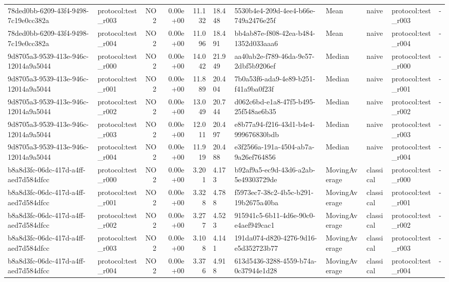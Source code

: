 \begin{table}[htbp]
\begin{tabular}{llrrr}
78ded0bb-6209-43f4-9498-7c19e0cc382a & protocol:test\_r003 & NO2 & 0.00e+00 & 11.132 & 18.448 & 5530b4e4-209d-4ee4-b66e-749a2476e25f & Mean & naive & protocol:test\_r003 & - \\
78ded0bb-6209-43f4-9498-7c19e0cc382a & protocol:test\_r004 & NO2 & 0.00e+00 & 11.096 & 18.491 & bb4ab87e-f808-42ea-b484-1352d033aaa6 & Mean & naive & protocol:test\_r004 & - \\
9d8705a3-9539-413e-946c-12014a9a5044 & protocol:test\_r000 & NO2 & 0.00e+00 & 14.042 & 21.949 & aa40ab2e-f789-46da-9e57-2dbf5b9206ef & Median & naive & protocol:test\_r000 & - \\
9d8705a3-9539-413e-946c-12014a9a5044 & protocol:test\_r001 & NO2 & 0.00e+00 & 11.889 & 20.404 & 7b0a53f6-ada9-4e89-b251-f41a9ba0f23f & Median & naive & protocol:test\_r001 & - \\
9d8705a3-9539-413e-946c-12014a9a5044 & protocol:test\_r002 & NO2 & 0.00e+00 & 13.049 & 20.744 & d062c6bd-e1a8-47f5-b495-25f548ae6b35 & Median & naive & protocol:test\_r002 & - \\
9d8705a3-9539-413e-946c-12014a9a5044 & protocol:test\_r003 & NO2 & 0.00e+00 & 12.011 & 20.497 & e8b77a94-f216-43d1-b4e4-999676830bdb & Median & naive & protocol:test\_r003 & - \\
9d8705a3-9539-413e-946c-12014a9a5044 & protocol:test\_r004 & NO2 & 0.00e+00 & 11.919 & 20.488 & e3f2566a-191a-4504-ab7a-9a26ef764856 & Median & naive & protocol:test\_r004 & - \\
b8a8d3fc-06dc-417d-a4ff-aed7d584dfcc & protocol:test\_r000 & NO2 & 0.00e+00 & 3.201 & 4.173 & b92af9a5-ec9d-43d6-a2ab-5e49303729de & MovingAverage & classical & protocol:test\_r000 & - \\
b8a8d3fc-06dc-417d-a4ff-aed7d584dfcc & protocol:test\_r001 & NO2 & 0.00e+00 & 3.328 & 4.788 & f5973ec7-38c2-4b5c-b291-19b2675a40ba & MovingAverage & classical & protocol:test\_r001 & - \\
b8a8d3fc-06dc-417d-a4ff-aed7d584dfcc & protocol:test\_r002 & NO2 & 0.00e+00 & 3.277 & 4.523 & 915941c5-6b11-4d6e-90c0-e4aef949cac1 & MovingAverage & classical & protocol:test\_r002 & - \\
b8a8d3fc-06dc-417d-a4ff-aed7d584dfcc & protocol:test\_r003 & NO2 & 0.00e+00 & 3.108 & 4.141 & 191da074-d820-4276-9d16-e5d352723b77 & MovingAverage & classical & protocol:test\_r003 & - \\
b8a8d3fc-06dc-417d-a4ff-aed7d584dfcc & protocol:test\_r004 & NO2 & 0.00e+00 & 3.376 & 4.918 & 613d5436-3288-4559-b74a-0c37944e1d28 & MovingAverage & classical & protocol:test\_r004 & - \\

\end{tabular}
\end{table}
